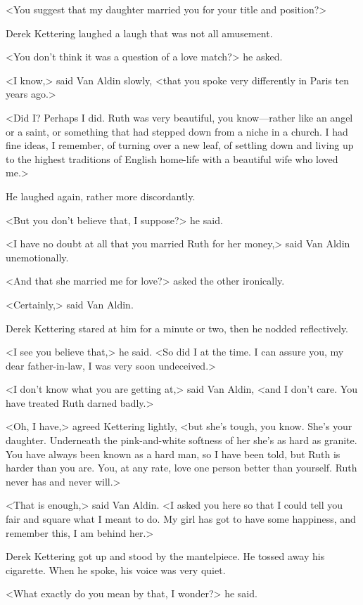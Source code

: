 <You suggest that my daughter married you for your title and position?>

Derek Kettering laughed a laugh that was not all amusement.

<You don't think it was a question of a love match?> he asked.

<I know,> said Van Aldin slowly, <that you spoke very differently in Paris ten years ago.>

<Did I? Perhaps I did. Ruth was very beautiful, you know—rather like an angel or a saint, or something that had stepped down from a niche in a church. I had fine ideas, I remember, of turning over a new leaf, of settling down and living up to the highest traditions of English home-life with a beautiful wife who loved me.>

He laughed again, rather more discordantly.

<But you don't believe that, I suppose?> he said.

<I have no doubt at all that you married Ruth for her money,> said Van Aldin unemotionally.

<And that she married me for love?> asked the other ironically.

<Certainly,> said Van Aldin.

Derek Kettering stared at him for a minute or two, then he nodded reflectively.

<I see you believe that,> he said. <So did I at the time. I can assure you, my dear father-in-law, I was very soon undeceived.>

<I don't know what you are getting at,> said Van Aldin, <and I don't care. You have treated Ruth darned badly.>

<Oh, I have,> agreed Kettering lightly, <but she's tough, you know. She's your daughter. Underneath the pink-and-white softness of her she's as hard as granite. You have always been known as a hard man, so I have been told, but Ruth is harder than you are. You, at any rate, love one person better than yourself. Ruth never has and never will.>

<That is enough,> said Van Aldin. <I asked you here so that I could tell you fair and square what I meant to do. My girl has got to have some happiness, and remember this, I am behind her.>

Derek Kettering got up and stood by the mantelpiece. He tossed away his cigarette. When he spoke, his voice was very quiet.

<What exactly do you mean by that, I wonder?> he said.

